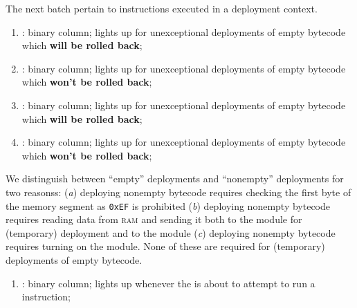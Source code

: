 The next batch pertain to  instructions executed in a deployment context.
\begin{enumerate}[resume]
	\item \scenReturnFromDeploymentEmptyByteCodeWillRevert:
		binary column;
		lights up for unexceptional  deployments of empty bytecode which \textbf{will be rolled back};
	\item \scenReturnFromDeploymentEmptyByteCodeWontRevert:
		binary column;
		lights up for unexceptional  deployments of empty bytecode which \textbf{won't be rolled back};
	\item \scenReturnFromDeploymentNonemptyByteCodeWillRevert:
		binary column;
		lights up for unexceptional  deployments of empty bytecode which \textbf{will be rolled back};
	\item \scenReturnFromDeploymentNonemptyByteCodeWontRevert:
		binary column;
		lights up for unexceptional  deployments of empty bytecode which \textbf{won't be rolled back};
\end{enumerate}
\saNote{} We distinguish between ``empty'' deployments and ``nonempty'' deployments for two reasonss:
(\emph{a}) deploying nonempty bytecode requires checking the first byte of the memory segment as \texttt{0xEF} is prohibited
(\emph{b}) deploying nonempty bytecode requires reading data from \textsc{ram} and sending it both to the \romMod{} module for (temporary) deployment and to the \hashDataMod{} module
(\emph{c}) deploying nonempty bytecode requires turning on the \hashInfoMod{} module.
None of these are required for (temporary) deployments of empty bytecode.

\begin{enumerate}[resume]
	\item \scenSelfdestruct:
		binary column; lights up whenever the \zkEvm{} is about to attempt to run a  instruction;
\end{enumerate}
